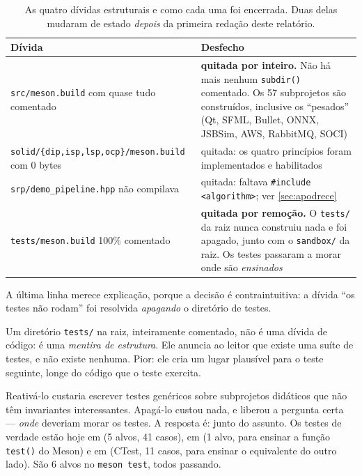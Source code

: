 \begin{table}[htbp]
\centering
\caption{As quatro dívidas estruturais e como cada uma foi encerrada. Duas
         delas mudaram de estado \emph{depois} da primeira redação deste
         relatório.}
\label{tab:dividas}
\footnotesize
\begin{tabular}{@{}p{}p{}@{}}
\toprule
\textbf{Dívida} & \textbf{Desfecho} \\
\midrule
\texttt{src/meson.build} com quase tudo comentado &
    \textbf{quitada por inteiro.} Não há mais nenhum \texttt{subdir()}
    comentado. Os 57 subprojetos são construídos, inclusive os ``pesados''
    (Qt, SFML, Bullet, ONNX, JSBSim, AWS, RabbitMQ, SOCI) \\[3pt]
\texttt{solid/\{dip,isp,lsp,ocp\}/meson.build} com 0 bytes &
    quitada: os quatro princípios foram implementados e habilitados \\[3pt]
\texttt{srp/demo\_pipeline.hpp} não compilava &
    quitada: faltava \texttt{\#include <algorithm>}; ver \cref{sec:apodrece} \\[3pt]
\texttt{tests/meson.build} 100\% comentado &
    \textbf{quitada por remoção.} O \texttt{tests/} da raiz nunca construiu
    nada e foi apagado, junto com o \texttt{sandbox/} da raiz. Os testes
    passaram a morar onde são \emph{ensinados} \\
\bottomrule
\end{tabular}
\end{table}

A última linha merece explicação, porque a decisão é contraintuitiva: a dívida
``os testes não rodam'' foi resolvida \emph{apagando} o diretório de testes.

\begin{porque}
Um diretório \texttt{tests/} na raiz, inteiramente comentado, não é uma dívida
de código: é uma \emph{mentira de estrutura}. Ele anuncia ao leitor que existe
uma suíte de testes, e não existe nenhuma. Pior: ele cria um lugar plausível
para o teste seguinte, longe do código que o teste exercita.

Reativá-lo custaria escrever testes genéricos sobre subprojetos didáticos que
não têm invariantes interessantes. Apagá-lo custou nada, e liberou a pergunta
certa --- \emph{onde} deveriam morar os testes. A resposta é: junto do assunto.
Os testes de verdade estão hoje em  (5 alvos, 41 casos), em
 (1 alvo, para ensinar a função \texttt{test()} do Meson) e em
 (CTest, 11 casos, para ensinar o equivalente do outro lado).
São 6 alvos no \texttt{meson test}, todos passando.
\end{porque}


